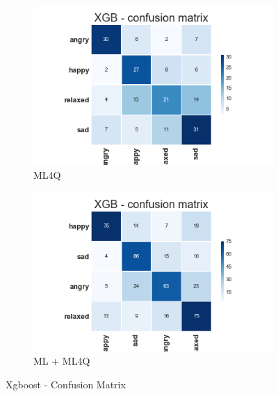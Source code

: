 \begin{figure}[H]
  \centering
  \begin{subfigure}[b]{0.4\linewidth}
    \includegraphics[width=\linewidth]{./chapters/chapter5/images/4Q/CM_XGB.png}
    \caption{ML4Q}
  \end{subfigure}
  \begin{subfigure}[b]{0.4\linewidth}
   \includegraphics[width=\linewidth]{./chapters/chapter5/images/join/CM_XGB.png}
    \caption{ML + ML4Q}
  \end{subfigure}
  \caption{Xgboost - Confusion Matrix}
  \label{fig:xgb}
\end{figure}




